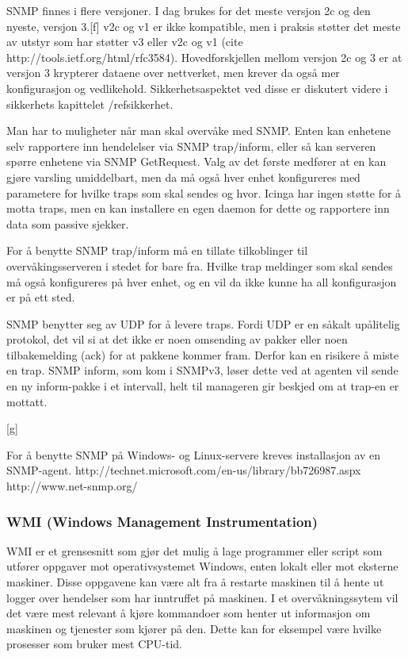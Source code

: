 SNMP finnes i flere versjoner. I dag brukes for det meste versjon 2c og den nyeste, versjon 3.[f] v2c og v1 er ikke kompatible, men i praksis støtter det meste av utstyr som har støtter v3 eller v2c og v1 (cite http://tools.ietf.org/html/rfc3584). Hovedforskjellen mellom versjon 2c og 3 er at versjon 3 krypterer dataene over nettverket, men krever da også mer konfigurasjon og vedlikehold. Sikkerhetsaspektet ved disse er diskutert videre i sikkerhets kapittelet /ref{sikkerhet}. 

Man har to muligheter når man skal overvåke med SNMP. Enten kan enhetene selv rapportere inn hendelelser via SNMP trap/inform, eller så kan serveren spørre enhetene via SNMP GetRequest. Valg av det første medfører at en kan gjøre varsling umiddelbart, men da må også hver enhet konfigureres med parametere for hvilke traps som skal sendes og hvor. Icinga har ingen støtte for å motta traps, men en kan installere en egen daemon for dette og rapportere inn data som passive sjekker. 

For å benytte SNMP trap/inform må en tillate tilkoblinger til overvåkingsserveren i stedet for bare fra. Hvilke trap meldinger som skal sendes må også konfigureres på hver enhet, og en vil da ikke kunne ha all konfigurasjon er på ett sted.


SNMP benytter seg av UDP for å levere traps. Fordi UDP er en såkalt upålitelig protokol, det vil si at det ikke er noen omsending av pakker eller noen tilbakemelding (ack) for at pakkene kommer fram. Derfor kan en risikere å miste en trap. SNMP inform, som kom i SNMPv3, løser dette ved at agenten vil sende en ny inform-pakke i et intervall, helt til manageren gir beskjed om at trap-en er mottatt.

[g]

For å benytte SNMP på Windows- og Linux-servere kreves installasjon av en SNMP-agent. http://technet.microsoft.com/en-us/library/bb726987.aspx http://www.net-snmp.org/ 

\subsubsection{WMI (Windows Management Instrumentation)}
WMI er et grensesnitt som gjør det mulig å lage programmer eller script som utfører oppgaver mot operativsystemet Windows, enten lokalt eller mot eksterne maskiner. Disse oppgavene kan være alt fra å restarte maskinen til å hente ut logger over hendelser som har inntruffet på maskinen. I et overvåkningssytem vil det være mest relevant å kjøre kommandoer som henter ut informasjon om maskinen og tjenester som kjører på den. Dette kan for eksempel være hvilke prosesser som bruker mest CPU-tid.

